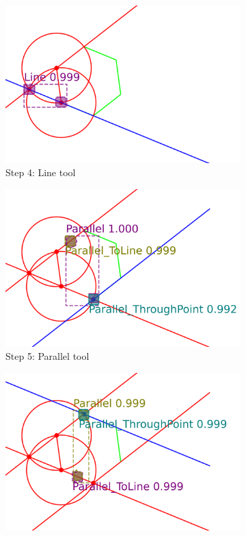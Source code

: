 \begin{figure}[!h]
\begin{subfigure}[t]{0.32\textwidth}
         \centering
         \includegraphics[width=\textwidth]{img/Epsilon-12_example/output_image3.png}
         \caption{Step 4: Line tool}
         \label{fig:Epsilon12_example_step4}
     \end{subfigure}
     \hfill
     \begin{subfigure}[t]{0.32\textwidth}
         \centering
         \includegraphics[width=\textwidth]{img/Epsilon-12_example/output_image4.png}
         \caption{Step 5: Parallel tool}
         \label{fig:Epsilon12_example_step5}
     \end{subfigure}
     \hfill
     \begin{subfigure}[t]{0.32\textwidth}
         \centering
         \includegraphics[width=\textwidth]{img/Epsilon-12_example/output_image5.png}

\end{subfigure}
\end{figure}
